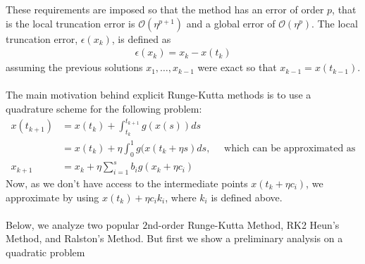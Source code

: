 These requirements are imposed so that the method has an
error of order $p$, that is the local truncation error is
$\mathcal{O}(\eta^{p + 1})$ and a global error of
$\mathcal{O}(\eta^{p})$. The local truncation error,
$\epsilon(x_k)$, is defined as
\begin{align*}
\epsilon(x_k) = x_k - x(t_k)
\end{align*}
assuming the previous solutions $x_1, \dots, x_{k - 1}$
were exact so that $x_{k - 1} = x(t_{k - 1})$.
\\
\\
The main motivation behind explicit Runge-Kutta
methods is to use a quadrature scheme for the following problem:
\begin{align*}
x(t_{k + 1}) &= x(t_{k}) + \int_{t_k}^{t_{k + 1}} g(x(s)) ds \\
&= x(t_{k}) + \eta \int_{0}^{1}g(x(t_{k} + \eta s) ds, \quad \text{ which can be approximated as} \\
x_{k + 1} &= x_k + \eta \sum_{i = 1}^{s} b_{i} g(x_{k} + \eta c_{i})
\end{align*}
Now, as we don't have access to the intermediate
points $x(t_{k} + \eta c_i)$, we approximate by
using $x(t_k) + \eta c_i k_i$, where $k_i$ is defined above.
\\
\\
Below, we analyze two popular $2$nd-order Runge-Kutta
Method, RK2 Heun's Method,  and Ralston's Method. But
first we show a preliminary analysis on a quadratic problem




